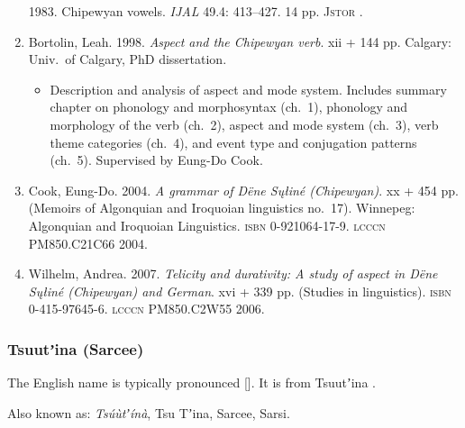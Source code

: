 \documentclass[12pt,letterpaper,oneside,article]{memoir}
\begin{document}
\begin{enumerate}
	1983.
	Chipewyan vowels.
	\textit{IJAL} 49.4: 413–427.
	14 pp.
	\textsc{Jstor} .
\item	Bortolin, Leah.
	1998.
	\textit{Aspect and the Chipewyan verb}.
	xii + 144 pp.
	Calgary: Univ.\ of Calgary, PhD dissertation.
	\begin{itemize}
	\item	Description and analysis of aspect and mode system.
		Includes summary chapter on phonology and morphosyntax (ch.\ 1),
		phonology and morphology of the verb (ch.\ 2),
		aspect and mode system (ch.\ 3),
		verb theme categories (ch.\ 4),
		and event type and conjugation patterns (ch.\ 5).
		Supervised by Eung-Do Cook.
	\end{itemize}
\item	Cook, Eung-Do.
	2004.
	\textit{A grammar of Dëne Sųłiné (Chipewyan)}.
	xx + 454 pp.
	(Memoirs of Algonquian and Iroquoian linguistics no.\ 17).
	Winnepeg: Algonquian and Iroquoian Linguistics.
	\textsc{isbn} 0-921064-17-9.
	\textsc{lcccn} PM850.C21C66 2004.
\item	Wilhelm, Andrea.
	2007.
	\textit{Telicity and durativity: A study of aspect in Dëne Sųłiné (Chipewyan)
		and German}.
	xvi + 339 pp.
	(Studies in linguistics).
	\textsc{isbn} 0-415-97645-6.
	\textsc{lcccn} PM850.C2W55 2006.
\end{enumerate}

\subsubsection{Tsuutʼina (Sarcee)}\label{sec:tsuutina}

The English name  is typically pronounced []. It is from Tsuutʼina .

Also known as: \textit{Tsúùtʼínà}, Tsu Tʼina, Sarcee, Sarsi.
\end{document}
